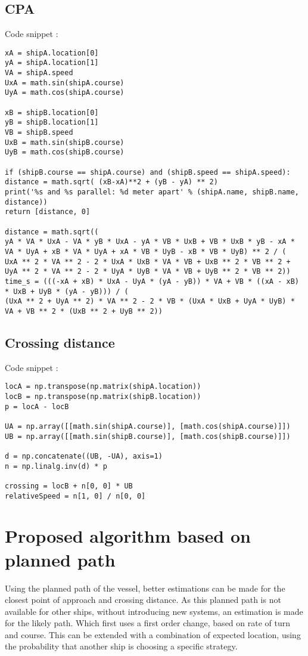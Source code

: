 \subsection{\acf{CPA}}
Code snippet :
\begin{lstlisting}
xA = shipA.location[0]
yA = shipA.location[1]
VA = shipA.speed
UxA = math.sin(shipA.course)
UyA = math.cos(shipA.course)

xB = shipB.location[0]
yB = shipB.location[1]
VB = shipB.speed
UxB = math.sin(shipB.course)
UyB = math.cos(shipB.course)

if (shipB.course == shipA.course) and (shipB.speed == shipA.speed):
distance = math.sqrt( (xB-xA)**2 + (yB - yA) ** 2)
print('%s and %s parallel: %d meter apart' % (shipA.name, shipB.name, distance))
return [distance, 0]

distance = math.sqrt((
yA * VA * UxA - VA * yB * UxA - yA * VB * UxB + VB * UxB * yB - xA * VA * UyA + xB * VA * UyA + xA * VB * UyB - xB * VB * UyB) ** 2 / (
UxA ** 2 * VA ** 2 - 2 * UxA * UxB * VA * VB + UxB ** 2 * VB ** 2 + UyA ** 2 * VA ** 2 - 2 * UyA * UyB * VA * VB + UyB ** 2 * VB ** 2))
time_s = (((-xA + xB) * UxA - UyA * (yA - yB)) * VA + VB * ((xA - xB) * UxB + UyB * (yA - yB))) / (
(UxA ** 2 + UyA ** 2) * VA ** 2 - 2 * VB * (UxA * UxB + UyA * UyB) * VA + VB ** 2 * (UxB ** 2 + UyB ** 2))
\end{lstlisting}

\subsection{Crossing distance}
Code snippet :
\begin{lstlisting}
locA = np.transpose(np.matrix(shipA.location))
locB = np.transpose(np.matrix(shipB.location))
p = locA - locB

UA = np.array([[math.sin(shipA.course)], [math.cos(shipA.course)]])
UB = np.array([[math.sin(shipB.course)], [math.cos(shipB.course)]])

d = np.concatenate((UB, -UA), axis=1)
n = np.linalg.inv(d) * p

crossing = locB + n[0, 0] * UB
relativeSpeed = n[1, 0] / n[0, 0]
\end{lstlisting}

\section{Proposed algorithm based on planned path}
Using the planned path of the vessel, better estimations can be made for the closest point of approach and crossing distance. As this planned path is not available for other ships, without introducing new systems, an estimation is made for the likely path. Which first uses a first order change, based on rate of turn and course. This can be extended with a combination of expected location, using the probability that another ship is choosing a specific strategy.

